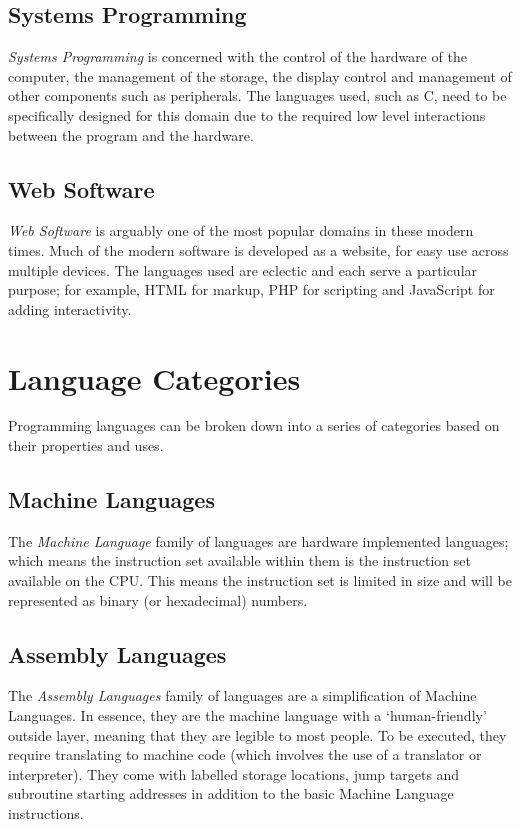 \subsection{Systems Programming}
\textit{Systems Programming} is concerned with the control of the hardware of the computer, the management of the storage, the display control and management of other components such as peripherals. The languages used, such as C, need to be specifically designed for this domain due to the required low level interactions between the program and the hardware.

\subsection{Web Software}
\textit{Web Software} is arguably one of the most popular domains in these modern times. Much of the modern software is developed as a website, for easy use across multiple devices. The languages used are eclectic and each serve a particular purpose; for example, HTML for markup, PHP for scripting and JavaScript for adding interactivity.

\section{Language Categories}
Programming languages can be broken down into a series of categories based on their properties and uses.
\subsection{Machine Languages}
The \textit{Machine Language} family of languages are hardware implemented languages; which means the instruction set available within them is the instruction set available on the CPU. This means the instruction set is limited in size and will be represented as binary (or hexadecimal) numbers.
\subsection{Assembly Languages}
The \textit{Assembly Languages} family of languages are a simplification of Machine Languages. In essence, they are the machine language with a `human-friendly' outside layer, meaning that they are legible to most people. To be executed, they require translating to machine code (which involves the use of a translator or interpreter). They come with labelled storage locations, jump targets and subroutine starting addresses in addition to the basic Machine Language instructions.
